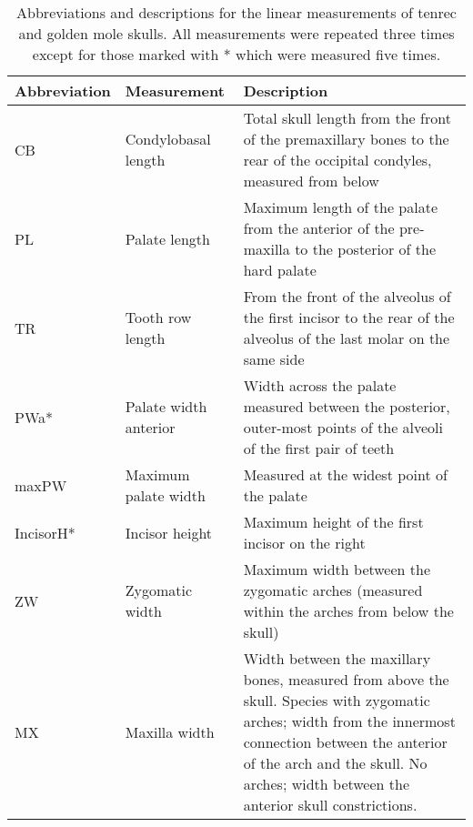 \begin{center}
\begin{longtable} {p{} p{} p{}}
\caption[Skull measurements] {Abbreviations and descriptions for the linear measurements of tenrec and golden mole skulls. All measurements were repeated three times except for those marked with * which were measured five times.}\\
\hline
\textbf{Abbreviation} & \textbf{Measurement} & \textbf{Description}\\
\hline
CB & Condylobasal length & Total skull length from the front of the premaxillary  bones to the rear of the occipital condyles, measured from below\\
PL & Palate length & Maximum length of the palate from the anterior of the pre-maxilla to the posterior of the hard palate\\
TR & Tooth row length & From the front of the alveolus of the first incisor to the rear of the alveolus of the last molar on the same side\\
PWa* & Palate width anterior & Width across the palate measured between the posterior, outer-most points of the alveoli of the first pair of teeth\\
maxPW & Maximum palate width & Measured at the widest point of the palate\\
IncisorH* & Incisor height & Maximum height of the first incisor on the right\\
ZW & Zygomatic width & Maximum width between the zygomatic arches (measured within the arches from below the skull)\\
MX & Maxilla width & Width between the maxillary bones, measured from above the skull. Species with zygomatic arches; width from the innermost connection between the anterior of the arch and the skull. No arches; width between the anterior skull constrictions.\\ 

\end{longtable}
\end{center}
